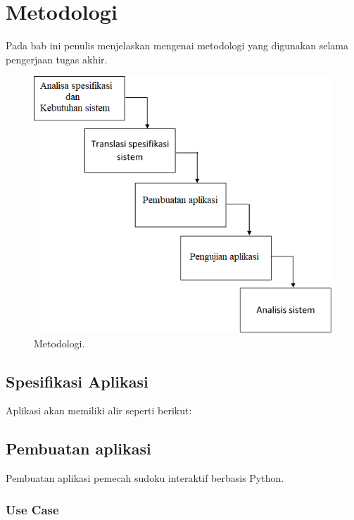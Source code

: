 \chapter{Metodologi}

Pada bab ini penulis menjelaskan mengenai metodologi yang digunakan selama pengerjaan tugas akhir.

\begin{figure}[H]
	\begin{centering}
		\includegraphics[scale=0.7]{metodologi_proposal}
		
		\caption{Metodologi.}
	\end{centering}
\end{figure}


\section{Spesifikasi Aplikasi}

Aplikasi akan memiliki alir seperti berikut:


\section{Pembuatan aplikasi}

Pembuatan aplikasi pemecah sudoku interaktif berbasis Python.

\subsection{Use Case}


